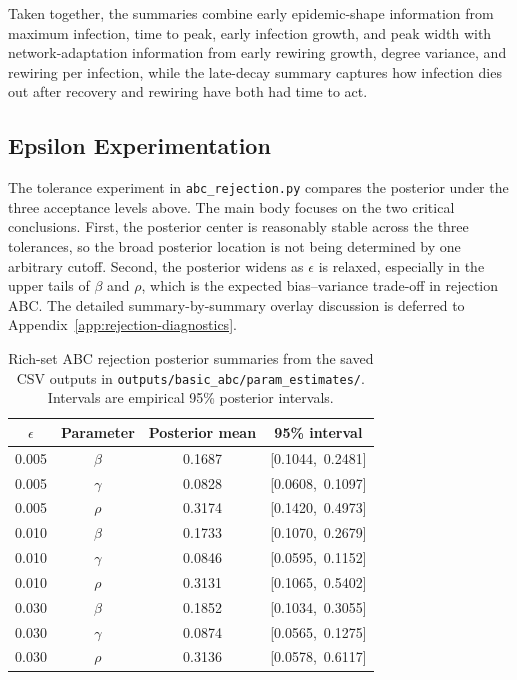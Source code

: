 \documentclass[11pt]{article}
\begin{document}
Taken together, the summaries combine early epidemic-shape information from maximum infection, time to peak, early infection growth, and peak width with network-adaptation information from early rewiring growth, degree variance, and rewiring per infection, while the late-decay summary captures how infection dies out after recovery and rewiring have both had time to act.

\subsection{Epsilon Experimentation}

The tolerance experiment in \texttt{abc\_rejection.py} compares the posterior under the three acceptance levels above. The main body focuses on the two critical conclusions. First, the posterior center is reasonably stable across the three tolerances, so the broad posterior location is not being determined by one arbitrary cutoff. Second, the posterior widens as $\epsilon$ is relaxed, especially in the upper tails of $\beta$ and $\rho$, which is the expected bias--variance trade-off in rejection ABC. The detailed summary-by-summary overlay discussion is deferred to Appendix~\ref{app:rejection-diagnostics}.

\begin{table}[H]
\centering
\caption{Rich-set ABC rejection posterior summaries from the saved CSV outputs in \texttt{outputs/basic\_abc/param\_estimates/}. Intervals are empirical 95\% posterior intervals.}
\label{tab:epsilon-results}
\begin{tabular}{cccc}
\toprule
$\epsilon$ & Parameter & Posterior mean & 95\% interval \\
\midrule
0.005 & $\beta$ & 0.1687 & [0.1044,\ 0.2481] \\
0.005 & $\gamma$ & 0.0828 & [0.0608,\ 0.1097] \\
0.005 & $\rho$ & 0.3174 & [0.1420,\ 0.4973] \\
\midrule
0.010 & $\beta$ & 0.1733 & [0.1070,\ 0.2679] \\
0.010 & $\gamma$ & 0.0846 & [0.0595,\ 0.1152] \\
0.010 & $\rho$ & 0.3131 & [0.1065,\ 0.5402] \\
\midrule
0.030 & $\beta$ & 0.1852 & [0.1034,\ 0.3055] \\
0.030 & $\gamma$ & 0.0874 & [0.0565,\ 0.1275] \\
0.030 & $\rho$ & 0.3136 & [0.0578,\ 0.6117] \\
\bottomrule
\end{tabular}
\end{table}
\end{document}

